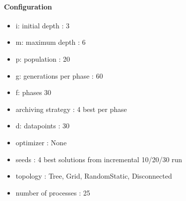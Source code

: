 \paragraph{Configuration}
\begin{itemize}
\item i: initial depth : 3
\item m: maximum depth : 6
\item p: population : 20
\item g: generations per phase : 60
\item f: phases 30
\item archiving strategy : 4 best per phase
\item d: datapoints : 30
\item optimizer : None
\item seeds : 4 best solutions from incremental 10/20/30 run
\item topology : Tree, Grid, RandomStatic, Disconnected
\item number of processes : 25
\end{itemize}
